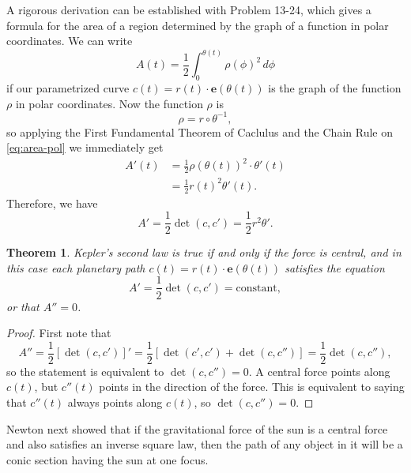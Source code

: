 \documentclass{article}
\numberwithin{corollary}{subsection}
\numberwithin{definition}{subsection}
\numberwithin{lemma}{subsection}
\newtheorem{theorem}{Theorem}
\numberwithin{theorem}{subsection}
\begin{document}
A rigorous derivation can be established with Problem 13-24, which gives a
formula for the area of a region determined by the graph of a function in polar
coordinates. We can write
\begin{equation} \label{eq:area-pol} \tag{*}
  A(t) = \frac{1}{2} \int_0^{\theta(t)} \rho(\phi)^2 \,d\phi
\end{equation}
if our parametrized curve $c(t) = r(t) \cdot \mathbf{e}(\theta(t))$ is the
graph of the function $\rho$ in polar coordinates. Now the function $\rho$ is
\[
  \rho = r \circ \theta^{-1},
\] so applying the First Fundamental Theorem of Caclulus and the Chain Rule on
\eqref{eq:area-pol} we immediately get
\begin{align*}
  A'(t) &= \frac{1}{2}\rho(\theta(t))^2 \cdot \theta'(t) \\
        &= \frac{1}{2} r(t)^2 \theta'(t).
\end{align*} Therefore, we have
\begin{equation} \label{eq:A'}
  \boxed{
    A' = \frac{1}{2}\det(c, c') = \frac{1}{2}r^2\theta'.
  }
\end{equation}

\begin{theorem}
  Kepler's second law is true if and only if the force is central, and in this
  case each planetary path $c(t) = r(t) \cdot \mathbf{e}(\theta(t))$ satisfies
  the equation
  \begin{equation} \label{eq:kep2} \tag{$K_2$}
    A' = \frac{1}{2}\det(c, c') = \text{constant},
  \end{equation} or that $A'' = 0$.
\end{theorem}
\begin{proof}
  First note that \[
    A'' = \frac{1}{2}[\det(c, c')]' = \frac{1}{2}[\det(c', c') + \det(c, c'')]
    = \frac{1}{2}\det(c, c''),
  \] so the statement is equivalent to $\det(c, c'') = 0$. A central force
  points along $c(t)$, but $c''(t)$ points in the direction of the force. This
  is equivalent to saying that $c''(t)$ always points along $c(t)$, so
  $\det(c, c'') = 0$.
\end{proof}

Newton next showed that if the gravitational force of the sun is a central
force and also satisfies an inverse square law, then the path of any object in
it will be a conic section having the sun at one focus.
\end{document}
